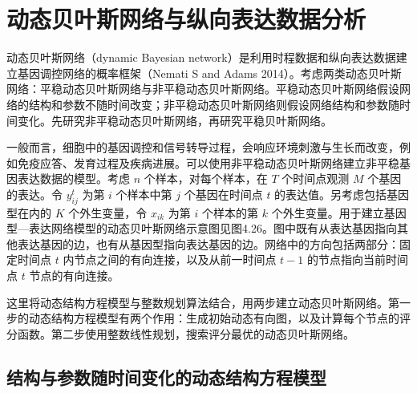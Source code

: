 \section{动态贝叶斯网络与纵向表达数据分析}

动态贝叶斯网络（dynamic Bayesian network）是利用时程数据和纵向表达数据建立基因调控网络的概率框架（Nemati S and Adams 2014）。考虑两类动态贝叶斯网络：平稳动态贝叶斯网络与非平稳动态贝叶斯网络。平稳动态贝叶斯网络假设网络的结构和参数不随时间改变；非平稳动态贝叶斯网络则假设网络结构和参数随时间变化。先研究非平稳动态贝叶斯网络，再研究平稳贝叶斯网络。

一般而言，细胞中的基因调控和信号转导过程，会响应环境刺激与生长而改变，例如免疫应答、发育过程及疾病进展。可以使用非平稳动态贝叶斯网络建立非平稳基因表达数据的模型。考虑 $n$ 个样本，对每个样本，在 $T$ 个时间点观测 $M$ 个基因的表达。令 $y_{ij}^t$ 为第 $i$ 个样本中第 $j$ 个基因在时间点 $t$ 的表达值。另考虑包括基因型在内的 $K$ 个外生变量，令 $x_{ik}$ 为第 $i$ 个样本的第 $k$ 个外生变量。用于建立基因型—表达网络模型的动态贝叶斯网络示意图见图4.26。图中既有从表达基因指向其他表达基因的边，也有从基因型指向表达基因的边。网络中的方向包括两部分：固定时间点 $t$ 内节点之间的有向连接，以及从前一时间点 $t-1$ 的节点指向当前时间点 $t$ 节点的有向连接。

\begin{figure}[htbp]
\centering
\resizebox{.98\linewidth}{!}{}
\end{figure}

这里将动态结构方程模型与整数规划算法结合，用两步建立动态贝叶斯网络。第一步的动态结构方程模型有两个作用：生成初始动态有向图，以及计算每个节点的评分函数。第二步使用整数线性规划，搜索评分最优的动态贝叶斯网络。

\subsection{结构与参数随时间变化的动态结构方程模型}


